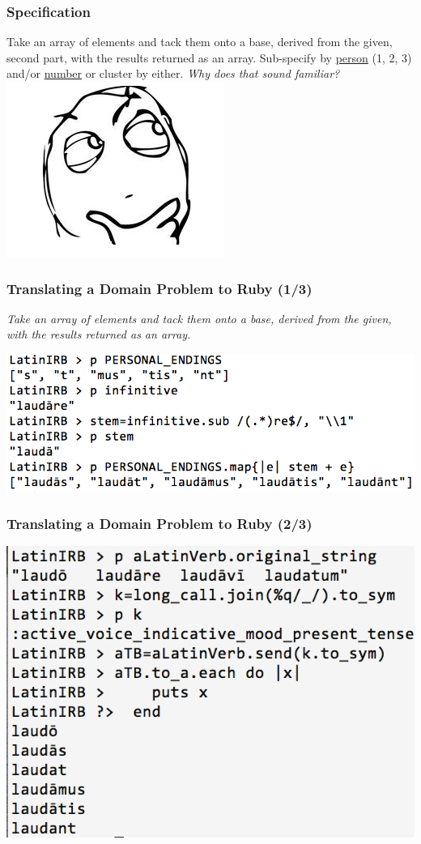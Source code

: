\documentclass[slidestop,compress,mathserif]{beamer}
\begin{document}
\begin{frame}
	\frametitle{Specification}
	Take an array of elements and tack them onto a base, derived from the given, second part, with the results returned as an array.  Sub-specify by \underline{person} (1, 2, 3) and/or \underline{number} or cluster by either.
	\pause
	\vskip 0.5cm
	\emph{Why does that sound familiar?}
	\vskip 0.5cm
	\includegraphics[scale=0.45]{img/determined.png}
\end{frame}


\begin{frame}
	\frametitle{Translating a Domain Problem to Ruby (1/3)}
	\emph{Take an array of elements and tack them onto a base, derived from the
    given, with the results returned as an array.
}	\begin{center}
		\includegraphics[scale=0.38]{img/conj_how.png}
	\end{center}
\end{frame}

\begin{frame}
	\frametitle{Translating a Domain Problem to Ruby (2/3)}
	\includegraphics[scale=0.39]{img/conj_how_3b.png}
\end{frame}
\end{document}
